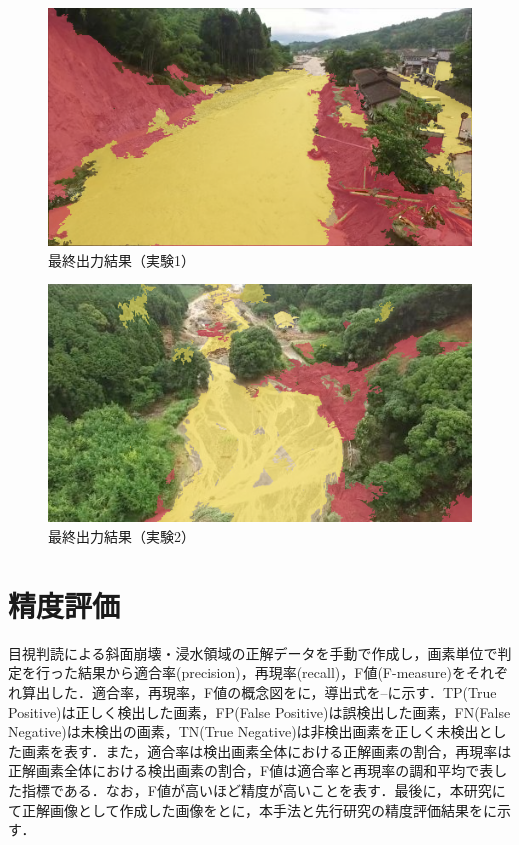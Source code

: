 \documentclass[../Thesis]{subfiles}
\begin{document}
\begin{figure}[tbp]
	\centering
	\includegraphics[width=12cm]{img/result1.png}
	\caption{最終出力結果（実験1）}
	\label{img16}
\end{figure}
\begin{figure}[tbp]
	\centering
	\includegraphics[width=12cm]{img/result2.png}
	\caption{最終出力結果（実験2）}
	\label{img17}
\end{figure}

\section{精度評価}
目視判読による斜面崩壊・浸水領域の正解データを手動で作成し，画素単位で判定を行った結果から適合率(precision)，再現率(recall)，F値(F-measure)をそれぞれ算出した．適合率，再現率，F値の概念図をに，導出式を--に示す．TP(True Positive)は正しく検出した画素，FP(False Positive)は誤検出した画素，FN(False Negative)は未検出の画素，TN(True Negative)は非検出画素を正しく未検出とした画素を表す．また，適合率は検出画素全体における正解画素の割合，再現率は正解画素全体における検出画素の割合，F値は適合率と再現率の調和平均で表した指標である．なお，F値が高いほど精度が高いことを表す．最後に，本研究にて正解画像として作成した画像をとに，本手法と先行研究の精度評価結果をに示す．
\end{document}
